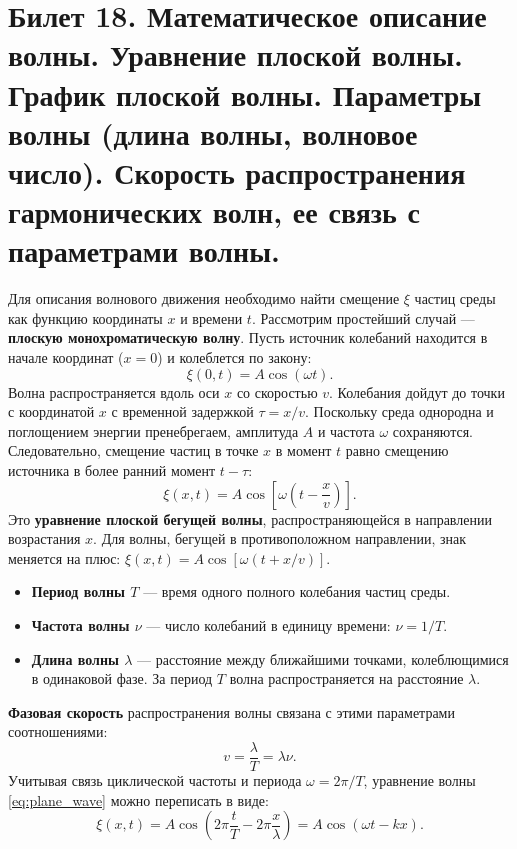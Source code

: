\section{Билет 18. Математическое описание волны. Уравнение плоской волны. График плоской волны. Параметры волны (длина волны, волновое число). Скорость распространения гармонических волн, ее связь с параметрами волны.}

\begin{definition}
Для описания волнового движения необходимо найти смещение $\xi$ частиц среды как функцию координаты $x$ и времени $t$. Рассмотрим простейший случай --- \textbf{плоскую монохроматическую волну}. Пусть источник колебаний находится в начале координат ($x=0$) и колеблется по закону:
\begin{equation}
    \xi(0, t) = A \cos(\omega t).
\end{equation}
Волна распространяется вдоль оси $x$ со скоростью $v$. Колебания дойдут до точки с координатой $x$ с временной задержкой $\tau = x/v$. Поскольку среда однородна и поглощением энергии пренебрегаем, амплитуда $A$ и частота $\omega$ сохраняются. Следовательно, смещение частиц в точке $x$ в момент $t$ равно смещению источника в более ранний момент $t - \tau$:
\begin{equation}
    \xi(x, t) = A \cos\left[\omega \left(t - \frac{x}{v}\right)\right]. \label{eq:plane_wave}
\end{equation}
Это \textbf{уравнение плоской бегущей волны}, распространяющейся в направлении возрастания $x$. Для волны, бегущей в противоположном направлении, знак меняется на плюс: $\xi(x, t) = A \cos[\omega(t + x/v)]$.
\end{definition}

\begin{property}
\begin{itemize}
    \item \textbf{Период волны $T$} --- время одного полного колебания частиц среды.
    \item \textbf{Частота волны $\nu$} --- число колебаний в единицу времени: $\nu = 1/T$.
    \item \textbf{Длина волны $\lambda$} --- расстояние между ближайшими точками, колеблющимися в одинаковой фазе. За период $T$ волна распространяется на расстояние $\lambda$.
\end{itemize}
\textbf{Фазовая скорость} распространения волны связана с этими параметрами соотношениями:
\begin{equation}
    v = \frac{\lambda}{T} = \lambda \nu. \label{eq:wave_speed}
\end{equation}
Учитывая связь циклической частоты и периода $\omega = 2\pi/T$, уравнение волны \eqref{eq:plane_wave} можно переписать в виде:
\begin{equation}
    \xi(x, t) = A \cos\left(2\pi \frac{t}{T} - 2\pi \frac{x}{\lambda}\right) = A \cos(\omega t - kx). \label{eq:wave_k}
\end{equation}
\end{property}


